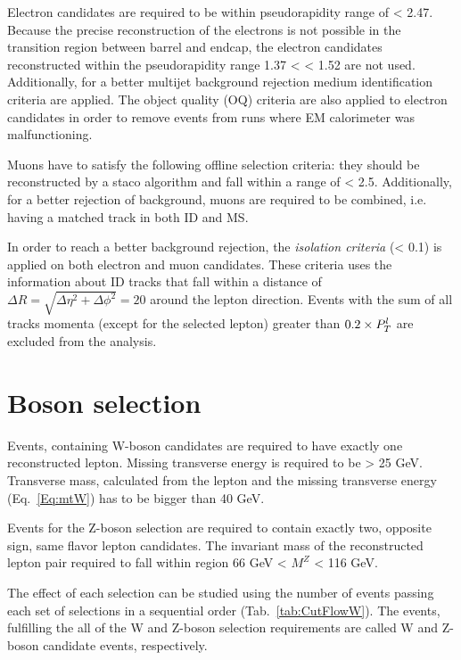 Electron candidates are required to be within pseudorapidity range of \etall < 2.47. Because the precise reconstruction of the electrons is not possible in the transition region between barrel and endcap, the electron candidates reconstructed within the pseudorapidity range 1.37 < \etall < 1.52 are not used.  Additionally, for a better multijet background rejection  medium identification criteria are applied. The object quality (OQ) criteria are also applied to electron candidates in order to remove events from runs where EM calorimeter was malfunctioning.

Muons have to satisfy the following offline selection criteria: they should be reconstructed by a staco algorithm and fall within a range of \etall < 2.5. Additionally, for a better rejection of background, muons are required to be combined, i.e. having a matched track in both ID and MS.

In order to reach a better background rejection, the \textit{isolation criteria} (\ptcone < 0.1) is applied on both electron and muon candidates. These criteria uses the information about ID tracks that fall within a distance of $\Delta R = \sqrt{\Delta\eta^2+\Delta\phi^2}=20$ around the lepton direction. Events with the sum of all tracks momenta (except for the selected lepton)  greater than $0.2\times P_T^l$ are excluded from the analysis. 

\section{Boson selection}
Events, containing W-boson candidates are required to have exactly one reconstructed lepton. Missing transverse energy is required to be \etmiss > 25 GeV.  Transverse mass, calculated from the lepton and the missing transverse energy (Eq.~\ref{Eq:mtW}) has to be bigger than 40 GeV.

Events for the Z-boson selection are required to contain exactly two, opposite sign, same flavor lepton candidates.  The invariant mass of the reconstructed lepton pair required to fall within region 66 GeV < $M^{Z}$ < 116 GeV. 

The effect of each selection can be studied using the number of events passing each set of selections in a sequential order (Tab.~\ref{tab:CutFlowW}). The events, fulfilling the all of the W and Z-boson selection requirements are called W and Z-boson candidate events, respectively.

